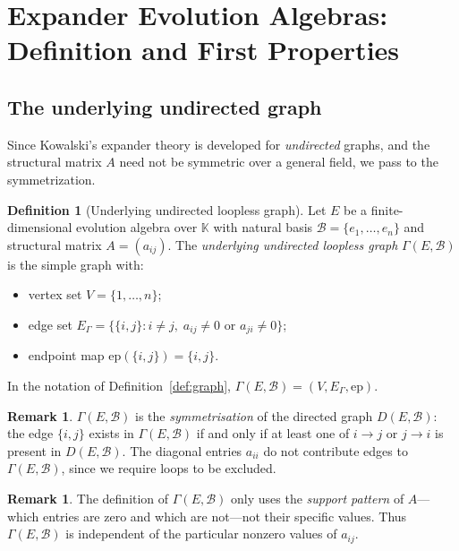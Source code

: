 \documentclass[12pt,a4paper]{amsart}
\theoremstyle{definition}
\newtheorem{definition}[theorem]{Definition}
\newtheorem{remark}[theorem]{Remark}
\newcommand{\K}{\mathbb{K}}
\newcommand{\EA}{E}          %
\newcommand{\natbasis}{\mathcal{B}}  %
\newcommand{\strmat}{A}      %
\begin{document}
\section{Expander Evolution Algebras: Definition and First Properties}
\label{sec:EEA}

\subsection{The underlying undirected graph}

Since Kowalski's expander theory is developed for \emph{undirected} graphs, and the
structural matrix $\strmat$ need not be symmetric over a general field, we pass to the
symmetrization.

\begin{definition}[Underlying undirected loopless graph]\label{def:assoc-graph}
Let $\EA$ be a finite-dimensional evolution algebra over $\K$ with
natural basis $\natbasis=\{e_1,\ldots,e_n\}$ and structural matrix
$\strmat=(a_{ij})$.  The \emph{underlying undirected loopless graph}
$\varGamma(\EA,\natbasis)$ is the simple graph with:
\begin{itemize}
  \item vertex set $V=\{1,\ldots,n\}$;
  \item edge set $E_\varGamma=\bigl\{\{i,j\}: i\ne j,\;
                                    a_{ij}\ne 0 \text{ or } a_{ji}\ne 0\bigr\}$;
  \item endpoint map $\mathrm{ep}(\{i,j\})=\{i,j\}$.
\end{itemize}
In the notation of Definition~\ref{def:graph}, $\varGamma(\EA,\natbasis)
=(V,E_\varGamma,\mathrm{ep})$.
\end{definition}

\begin{remark}\label{rem:symm}
$\varGamma(\EA,\natbasis)$ is the \emph{symmetrisation} of the directed
graph $D(\EA,\natbasis)$: the edge $\{i,j\}$ exists in
$\varGamma(\EA,\natbasis)$ if and only if at least one of $i\to j$ or
$j\to i$ is present in $D(\EA,\natbasis)$.  The diagonal entries
$a_{ii}$ do not contribute edges to $\varGamma(\EA,\natbasis)$, since we
require loops to be excluded.
\end{remark}

\begin{remark}\label{rem:field}
The definition of $\varGamma(\EA,\natbasis)$ only uses the
\emph{support pattern} of $\strmat$---which entries are zero and which
are not---not their specific values.  Thus $\varGamma(\EA,\natbasis)$
is independent of the particular nonzero values of $a_{ij}$.
\end{remark}
\end{document}
